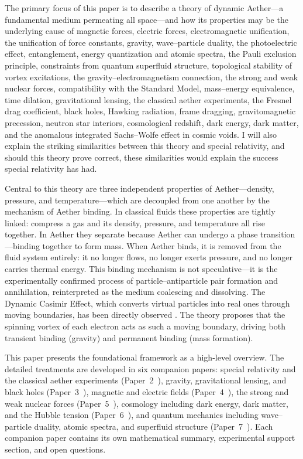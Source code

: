 \documentclass[12pt,letterpaper]{article}
\begin{document}
The primary focus of this paper is to describe a theory of dynamic Aether---a fundamental
medium permeating all space---and how its properties may be the underlying cause of
magnetic forces, electric forces, electromagnetic unification, the unification of force
constants, gravity, wave--particle duality, the photoelectric effect, entanglement, energy quantization and atomic spectra, the Pauli exclusion principle, constraints from quantum superfluid structure, topological stability of vortex excitations, the gravity--electromagnetism connection, the strong and weak nuclear forces, compatibility with the Standard Model, mass--energy
equivalence, time dilation, gravitational lensing, the classical aether experiments,
the Fresnel drag coefficient, black holes, Hawking radiation, frame dragging, gravitomagnetic precession, neutron star interiors,
cosmological redshift, dark energy, dark matter, and the anomalous integrated Sachs--Wolfe effect in cosmic voids.
I will also explain the striking similarities between this theory and
special relativity, and should this theory prove correct, these similarities would explain
the success special relativity has had.

Central to this theory are three independent properties of Aether---density, pressure,
and temperature---which are decoupled from one another by the mechanism of Aether binding.
In classical fluids these properties are tightly linked: compress a gas and its density,
pressure, and temperature all rise together.  In Aether they separate because Aether can
undergo a phase transition---binding together to form mass.  When Aether binds, it is
removed from the fluid system entirely: it no longer flows, no longer exerts pressure, and
no longer carries thermal energy.  This binding mechanism is not speculative---it is the
experimentally confirmed process of particle--antiparticle pair formation and annihilation,
reinterpreted as the medium coalescing and dissolving.  The Dynamic Casimir Effect, which
converts virtual particles into real ones through moving boundaries, has been directly
observed \cite{wilson2011}.  The theory proposes that the spinning vortex of each electron
acts as such a moving boundary, driving both transient binding (gravity) and permanent
binding (mass formation).

This paper presents the foundational framework as a high-level overview.
The detailed treatments are developed in six companion papers:
special relativity and the classical aether experiments
(Paper~2~\cite{otto-relativity}),
gravity, gravitational lensing, and black holes
(Paper~3~\cite{otto-gravity}),
magnetic and electric fields
(Paper~4~\cite{otto-em}),
the strong and weak nuclear forces
(Paper~5~\cite{otto-nuclear}),
cosmology including dark energy, dark matter, and the Hubble tension
(Paper~6~\cite{otto-cosmology}),
and quantum mechanics including wave--particle duality, atomic spectra, and
superfluid structure
(Paper~7~\cite{otto-qm}).
Each companion paper contains its own mathematical summary, experimental
support section, and open questions.
\end{document}

